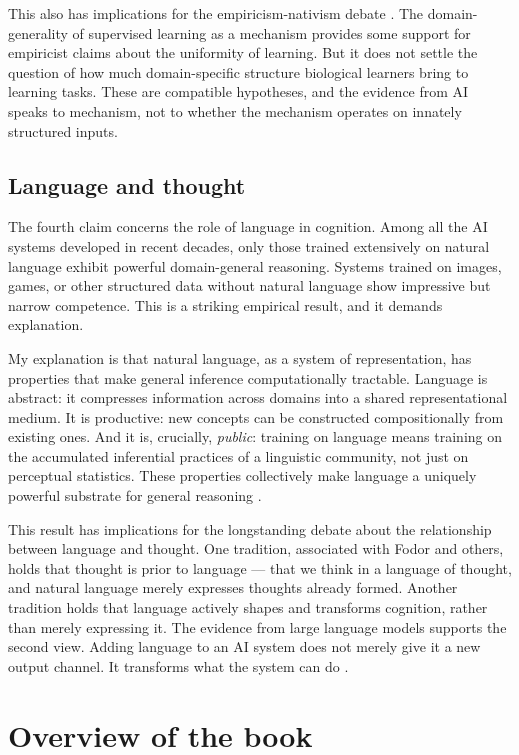 \documentclass{drpaper}
\begin{document}
This also has implications for the empiricism-nativism debate \citep{Buckner2023-BUCFDL}. The domain-generality of supervised learning as a mechanism provides some support for empiricist claims about the uniformity of learning. But it does not settle the question of how much domain-specific structure biological learners bring to learning tasks. These are compatible hypotheses, and the evidence from AI speaks to mechanism, not to whether the mechanism operates on innately structured inputs.

\subsection{Language and thought}

The fourth claim concerns the role of language in cognition. Among all the AI systems developed in recent decades, only those trained extensively on natural language exhibit powerful domain-general reasoning. Systems trained on images, games, or other structured data without natural language show impressive but narrow competence. This is a striking empirical result, and it demands explanation.

My explanation is that natural language, as a system of representation, has properties that make general inference computationally tractable. Language is abstract: it compresses information across domains into a shared representational medium. It is productive: new concepts can be constructed compositionally from existing ones. And it is, crucially, \emph{public}: training on language means training on the accumulated inferential practices of a linguistic community, not just on perceptual statistics. These properties collectively make language a uniquely powerful substrate for general reasoning \citep{lupyan2016language}.

This result has implications for the longstanding debate about the relationship between language and thought. One tradition, associated with Fodor and others, holds that thought is prior to language — that we think in a language of thought, and natural language merely expresses thoughts already formed. Another tradition holds that language actively shapes and transforms cognition, rather than merely expressing it. The evidence from large language models supports the second view. Adding language to an AI system does not merely give it a new output channel. It transforms what the system can do \citep{MAHOWALD2024517}.

\section{Overview of the book}
\end{document}
